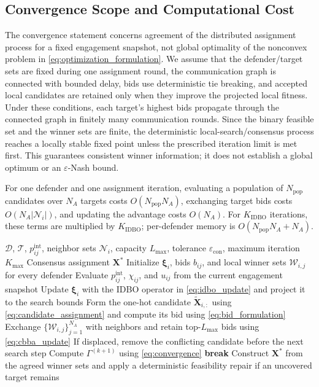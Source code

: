\subsection{Convergence Scope and Computational Cost}
\label{subsec:convergence_equilibrium}

The convergence statement concerns agreement of the distributed assignment process for a
fixed engagement snapshot, not global optimality of the nonconvex problem in
\eqref{eq:optimization_formulation}. We assume that the defender/target sets are fixed during
one assignment round, the communication graph is connected with bounded delay, bids use
deterministic tie breaking, and accepted local candidates are retained only when they improve
the projected local fitness. Under these conditions, each target's highest bids propagate
through the connected graph in finitely many communication rounds. Since the binary feasible
set and the winner sets are finite, the deterministic local-search/consensus process reaches a
locally stable fixed point unless the prescribed iteration limit is met first. This guarantees
consistent winner information; it does not establish a global optimum or an
$\varepsilon$-Nash bound.

For one defender and one assignment iteration, evaluating a population of $N_{\mathrm{pop}}$
candidates over $N_A$ targets costs $O(N_{\mathrm{pop}}N_A)$, exchanging target bids costs
$O(N_A|\mathcal N_i|)$, and updating the advantage costs $O(N_A)$. For $K_{\mathrm{IDBO}}$
iterations, these terms are multiplied by $K_{\mathrm{IDBO}}$; per-defender memory is
$O(N_{\mathrm{pop}}N_A+N_A)$.

\begin{algorithm}[!t]
\caption{Distributed Consensus-Based IDBO Target Assignment}
\label{alg:idbo}
\footnotesize
\begin{algorithmic}[1]
\REQUIRE $\mathcal D$, $\mathcal T$, $p_{ij}^{\mathrm{int}}$, neighbor sets
$\mathcal N_i$, capacity $L_{\max}$, tolerance $\varepsilon_{\mathrm{con}}$,
maximum iteration $K_{\max}$
\ENSURE Consensus assignment $\mathbf X^{*}$
\STATE Initialize $\boldsymbol\xi_i$, bids $b_{ij}$, and local winner sets
$\mathcal W_{i,j}$ for every defender
        \STATE Evaluate $p_{ij}^{\mathrm{int}}$, $\chi_{ij}$, and
        $u_{ij}$ from the current engagement snapshot
        \STATE Update $\boldsymbol\xi_i$ with the IDBO operator in
        \eqref{eq:idbo_update} and project it to the search bounds
        \STATE Form the one-hot candidate $\widetilde{\mathbf X}_{i,:}$ using
        \eqref{eq:candidate_assignment} and compute its bid using
        \eqref{eq:bid_formulation}
        \STATE Exchange $\{\mathcal W_{i,j}\}_{j=1}^{N_A}$ with neighbors and
        retain top-$L_{\max}$ bids using \eqref{eq:cbba_update}
        \STATE If displaced, remove the conflicting candidate before the next search step
    \ENDFOR
    \STATE Compute $\Gamma^{(k+1)}$ using \eqref{eq:convergence}
        \STATE \textbf{break}
    \ENDIF
\ENDFOR
\STATE Construct $\mathbf X^{*}$ from the agreed winner sets and apply a deterministic
feasibility repair if an uncovered target remains
\end{algorithmic}
\end{algorithm}
